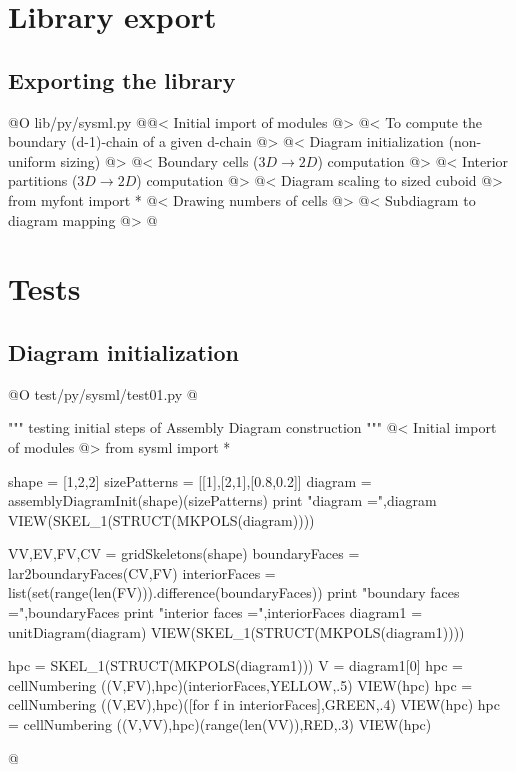 \documentclass[11pt,oneside]{article}	%
\begin{document}
\section{Library export}
\subsection{Exporting the library}

@O lib/py/sysml.py
@{@< Initial import of modules @>
@< To compute the boundary (d-1)-chain of a given d-chain @>
@< Diagram initialization (non-uniform sizing) @>
@< Boundary cells ($3D\to 2D$) computation @>
@< Interior partitions ($3D\to 2D$) computation @>
@< Diagram scaling to sized cuboid @>
from myfont import *
@< Drawing numbers of cells @>
@< Subdiagram to diagram mapping @>
@}

\section{Tests}
\subsection{Diagram initialization}

@O test/py/sysml/test01.py
@{""" testing initial steps of Assembly Diagram construction """
@< Initial import of modules @>
from sysml import *

shape = [1,2,2]
sizePatterns = [[1],[2,1],[0.8,0.2]]
diagram = assemblyDiagramInit(shape)(sizePatterns)
print "\n diagram =",diagram
VIEW(SKEL_1(STRUCT(MKPOLS(diagram))))

VV,EV,FV,CV = gridSkeletons(shape)
boundaryFaces = lar2boundaryFaces(CV,FV)
interiorFaces = list(set(range(len(FV))).difference(boundaryFaces))
print "\n boundary faces =",boundaryFaces
print "\n interior faces =",interiorFaces
diagram1 = unitDiagram(diagram)
VIEW(SKEL_1(STRUCT(MKPOLS(diagram1))))

hpc = SKEL_1(STRUCT(MKPOLS(diagram1)))
V = diagram1[0]
hpc = cellNumbering ((V,FV),hpc)(interiorFaces,YELLOW,.5)
VIEW(hpc)
hpc = cellNumbering ((V,EV),hpc)([for f in interiorFaces],GREEN,.4)
VIEW(hpc)
hpc = cellNumbering ((V,VV),hpc)(range(len(VV)),RED,.3)
VIEW(hpc)

@}
\end{document}
